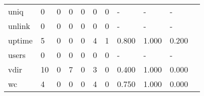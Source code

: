 \begin{longtable}{lp{1.2cm}p{1.2cm}p{1.2cm}p{1.2cm}p{1.2cm}p{1.2cm}p{1.2cm}p{1.2cm}p{1.2cm}p{1.2cm}}
uniq      &                                     0 &                                                  0 &                                                0 &                                               0 &                                                0 &                                              0 &                                             - &                                                  - &                                                  - \\
unlink    &                                     0 &                                                  0 &                                                0 &                                               0 &                                                0 &                                              0 &                                             - &                                                  - &                                                  - \\
uptime    &                                     5 &                                                  0 &                                                0 &                                               0 &                                                4 &                                              1 &                                         0.800 &                                              1.000 &                                              0.200 \\
users     &                                     0 &                                                  0 &                                                0 &                                               0 &                                                0 &                                              0 &                                             - &                                                  - &                                                  - \\
vdir      &                                    10 &                                                  0 &                                                7 &                                               0 &                                                3 &                                              0 &                                         0.400 &                                              1.000 &                                              0.000 \\
wc        &                                     4 &                                                  0 &                                                0 &                                               0 &                                                4 &                                              0 &                                         0.750 &                                              1.000 &                                              0.000 \\

\end{longtable}
